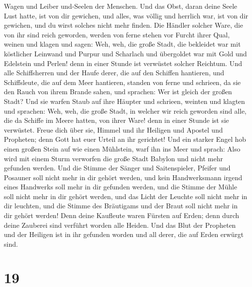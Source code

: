 Wagen und Leiber und-Seelen der Menschen.  Und das Obst,
daran deine Seele Lust hatte, ist von dir gewichen, und alles, was
völlig und herrlich war, ist von dir gewichen, und du wirst solches
nicht mehr finden.  Die Händler solcher Ware, die von ihr
sind reich geworden, werden von ferne stehen vor Furcht ihrer Qual,
weinen und klagen  und sagen: Weh, weh, die große Stadt,
die bekleidet war mit köstlicher Leinwand und Purpur und Scharlach und
übergoldet war mit Gold und Edelstein und Perlen!  denn in
einer Stunde ist verwüstet solcher Reichtum. Und alle Schiffsherren und
der Haufe derer, die auf den Schiffen hantieren, und Schiffsleute, die
auf dem Meer hantieren, standen von ferne  und schrieen, da
sie den Rauch von ihrem Brande sahen, und sprachen: Wer ist gleich der
großen Stadt?  Und sie warfen Staub auf ihre Häupter und
schrieen, weinten und klagten und sprachen: Weh, weh, die große Stadt,
in welcher wir reich geworden sind alle, die da Schiffe im Meere hatten,
von ihrer Ware! denn in einer Stunde ist sie verwüstet. 
Freue dich über sie, Himmel und ihr Heiligen und Apostel und Propheten;
denn Gott hat euer Urteil an ihr gerichtet!  Und ein
starker Engel hob einen großen Stein auf wie einen Mühlstein, warf ihn
ins Meer und sprach: Also wird mit einem Sturm verworfen die große Stadt
Babylon und nicht mehr gefunden werden.  Und die Stimme der
Sänger und Saitenspieler, Pfeifer und Posauner soll nicht mehr in dir
gehört werden, und kein Handwerksmann irgend eines Handwerks soll mehr
in dir gefunden werden, und die Stimme der Mühle soll nicht mehr in dir
gehört werden,  und das Licht der Leuchte soll nicht mehr
in dir leuchten, und die Stimme des Bräutigams und der Braut soll nicht
mehr in dir gehört werden! Denn deine Kaufleute waren Fürsten auf Erden;
denn durch deine Zauberei sind verführt worden alle Heiden.
 Und das Blut der Propheten und der Heiligen ist in ihr
gefunden worden und all derer, die auf Erden erwürgt sind.

\hypertarget{section-18}{%
\section{19}\label{section-18}}

